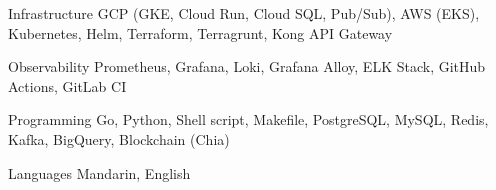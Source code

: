 

\begin{cvskills}

  \cvskill
    {Infrastructure} %
    {GCP (GKE, Cloud Run, Cloud SQL, Pub/Sub), AWS (EKS), Kubernetes, Helm, Terraform, Terragrunt, Kong API Gateway} %

  \cvskill
    {Observability} %
    {Prometheus, Grafana, Loki, Grafana Alloy, ELK Stack, GitHub Actions, GitLab CI} %

  \cvskill
    {Programming} %
    {Go, Python, Shell script, Makefile, PostgreSQL, MySQL, Redis, Kafka, BigQuery, Blockchain (Chia)} %

  \cvskill
    {Languages} %
    {Mandarin, English} %

\end{cvskills}

